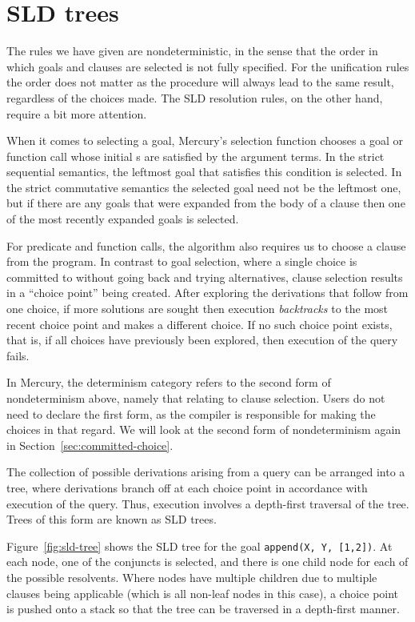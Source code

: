 \section{SLD trees}
\label{sec:sld-trees}

The rules we have given are nondeterministic,
in the sense that
the order in which goals and clauses are selected
is not fully specified.
For the unification rules the order does not matter
as the procedure will always lead to the same result,
regardless of the choices made.
The SLD resolution rules, on the other hand,
require a bit more attention.

When it comes to selecting a goal,
Mercury's selection function chooses a goal or function call
whose initial s
are satisfied by the argument terms.
In the strict sequential semantics,
the leftmost goal that satisfies this condition is selected.
In the strict commutative semantics
the selected goal need not be the leftmost one,
but if there are any goals
that were expanded from the body of a clause
then one of the most recently expanded goals is selected.

For predicate and function calls,
the algorithm also requires us to choose a clause from the program.
In contrast to goal selection,
where a single choice is committed to
without going back and trying alternatives,
clause selection results in a ``choice point\label{gi:choice-point}''
being created.
After exploring the derivations that follow from one choice,
if more solutions are sought then
execution \emph{backtracks\label{gi:backtrack}}
to the most recent choice point
and makes a different choice.
If no such choice point exists,
that is, if all choices have previously been explored,
then execution of the query fails.

In Mercury,
the  determinism category
refers to the second form of nondeterminism above,
namely that relating to clause selection.
Users do not need to declare the first form,
as the compiler is responsible for making the choices in that regard.
We will look at the second form of nondeterminism again
in Section~\ref{sec:committed-choice}.

The collection of possible derivations arising from a query
can be arranged into a tree,
where derivations branch off at each choice point
in accordance with execution of the query.
Thus, execution involves a depth-first traversal of the tree.
Trees of this form are known as SLD trees\label{gi:sld-tree}.

Figure~\ref{fig:sld-tree} shows the SLD tree
for the goal \texttt{append(X, Y, [1,2])}.
At each node, one of the conjuncts is selected,
and there is one child node for each of the possible resolvents.
Where nodes have multiple children
due to multiple clauses being applicable
(which is all non-leaf nodes in this case),
a choice point is pushed onto a stack
so that the tree can be traversed in a depth-first manner.

